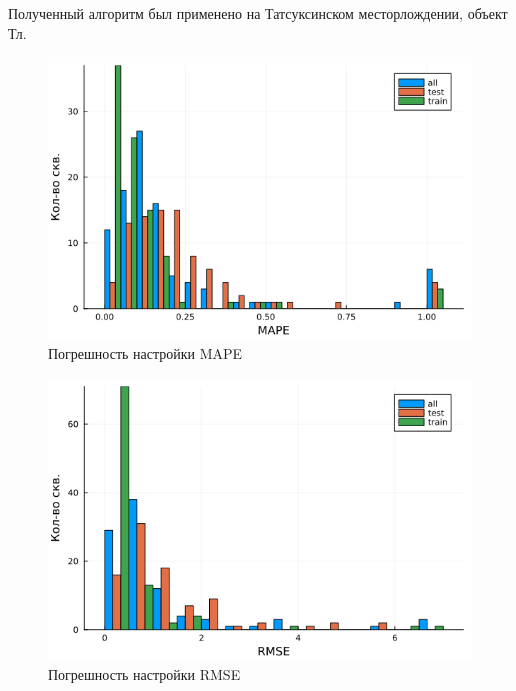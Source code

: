 \documentclass[14pt]{article}
\begin{document}
Полученный алгоритм был применено на Татсуксинском месторлождении, объект Тл.

\begin{figure}[!htb]
	\centering
	\includegraphics[width=1.0\linewidth]{pic/hist_mape_tat_a4}
	\caption{Погрешность настройки MAPE}
	\label{fig:MAPE_A4}
\end{figure}

\begin{figure}[!htb]
	\centering
	\includegraphics[width=1.0\linewidth]{pic/hist_rmse_tat_a4}
	\caption{Погрешность настройки RMSE}
	\label{fig:RMSE_A4}
\end{figure}
\end{document}
